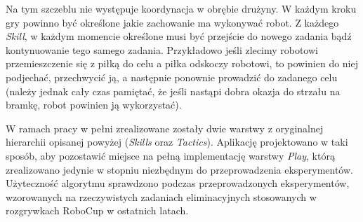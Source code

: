 \begin{enumerate}
  Na tym szczeblu nie występuje koordynacja w obrębie drużyny. W każdym kroku gry powinno być określone jakie zachowanie ma wykonywać robot. Z każdego \textit{Skill}, w każdym momencie określone musi być przejście
  do nowego zadania bądź kontynuowanie tego samego zadania. Przykładowo jeśli zlecimy robotowi przemieszczenie się z piłką do celu a piłka 
  odskoczy robotowi, to powinien do niej podjechać, przechwycić ją, a następnie ponownie prowadzić do zadanego celu (należy jednak cały czas pamiętać, że jeśli nastąpi dobra okazja do strzału
na bramkę, robot powinien ją wykorzystać).
\end{enumerate}

 W ramach pracy w pełni zrealizowane zostały dwie warstwy z oryginalnej hierarchii opisanej powyżej (\textit{Skills} oraz \textit{Tactics}). Aplikację projektowano w taki sposób, aby pozostawić miejsce
 na pełną implementację warstwy \textit{Play}, którą zrealizowano jedynie w stopniu niezbędnym do przeprowadzenia eksperymentów.
Użyteczność algorytmu sprawdzono podczas przeprowadzonych eksperymentów, wzorowanych na rzeczywistych zadaniach eliminacyjnych stosowanych w rozgrywkach RoboCup w ostatnich latach.

